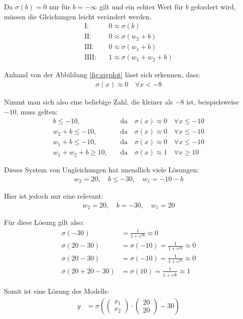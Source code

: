 \begin{flushleft}
Da $\sigma(b)=0$ nur für $b=-\infty$ gilt und ein echter Wert für $b$ gefordert wird, müssen die Gleichungen leicht verändert werden.
\begin{align}
    \text{I:}&\quad 0\approx\sigma(b) \\
    \text{II:}&\quad 0\approx\sigma(w_2+b) \\
    \text{III:}&\quad 0\approx\sigma(w_1+b) \\
    \text{IIII:}&\quad 1\approx\sigma(w_1+w_2+b)
\end{align}

Anhand von der Abbildung \ref{fig:sigplot} lässt sich erkennen, dass:
\begin{align}
    \sigma(x)\approx0\quad \forall x< -8
\end{align}

Nimmt man sich also eine beliebige Zahl, die kleiner als $-8$ ist, beispielsweise $-10$, muss gelten:
\begin{align}
    b\leq -10,&\quad\text{da}\quad\sigma(x)\approx 0\quad\forall x\leq -10 \\
    w_2+b\leq -10,&\quad\text{da}\quad\sigma(x)\approx 0\quad\forall x\leq -10 \\
    w_1+b\leq -10,&\quad\text{da}\quad\sigma(x)\approx 0\quad\forall x\leq -10 \\
    w_1+w_2+b\geq 10,&\quad\text{da}\quad\sigma(x)\approx 1\quad\forall x\geq 10
\end{align}

Dieses System von Ungleichungen hat unendlich viele Lösungen:
\begin{align}
    w_2=20,\quad b\leq -30,\quad w_1=-10-b
\end{align}

Hier ist jedoch nur eine relevant:
\begin{align}
    w_2=20,\quad b=-30,\quad w_1=20
\end{align}

Für diese Lösung gilt also:
\begin{align}
    \sigma(-30)&=\frac{1}{1+e^{30}}\approx 0 \\
    \sigma(20-30)&=\sigma(-10)=\frac{1}{1+e^{10}}\approx 0 \\
    \sigma(20-30)&=\sigma(-10)=\frac{1}{1+e^{10}}\approx 0 \\
    \sigma(20+20-30)&=\sigma(10)=\frac{1}{1+e^{\frac{1}{10}}}\approx 1
\end{align}

Somit ist eine Lösung des Modells:
\begin{align}
    y&=\sigma\left(\begin{pmatrix}
        x_1 \\
        x_2
    \end{pmatrix}\cdot
    \begin{pmatrix}
        20 \\
        20
    \end{pmatrix}-30\right)
\end{align}
\end{flushleft}

